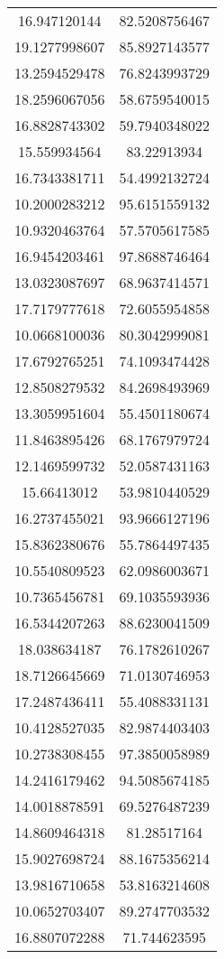 \begin{table}
\begin{tabular}{cc}
16.947120144 & 82.5208756467 \\
19.1277998607 & 85.8927143577 \\
13.2594529478 & 76.8243993729 \\
18.2596067056 & 58.6759540015 \\
16.8828743302 & 59.7940348022 \\
15.559934564 & 83.22913934 \\
16.7343381711 & 54.4992132724 \\
10.2000283212 & 95.6151559132 \\
10.9320463764 & 57.5705617585 \\
16.9454203461 & 97.8688746464 \\
13.0323087697 & 68.9637414571 \\
17.7179777618 & 72.6055954858 \\
10.0668100036 & 80.3042999081 \\
17.6792765251 & 74.1093474428 \\
12.8508279532 & 84.2698493969 \\
13.3059951604 & 55.4501180674 \\
11.8463895426 & 68.1767979724 \\
12.1469599732 & 52.0587431163 \\
15.66413012 & 53.9810440529 \\
16.2737455021 & 93.9666127196 \\
15.8362380676 & 55.7864497435 \\
10.5540809523 & 62.0986003671 \\
10.7365456781 & 69.1035593936 \\
16.5344207263 & 88.6230041509 \\
18.038634187 & 76.1782610267 \\
18.7126645669 & 71.0130746953 \\
17.2487436411 & 55.4088331131 \\
10.4128527035 & 82.9874403403 \\
10.2738308455 & 97.3850058989 \\
14.2416179462 & 94.5085674185 \\
14.0018878591 & 69.5276487239 \\
14.8609464318 & 81.28517164 \\
15.9027698724 & 88.1675356214 \\
13.9816710658 & 53.8163214608 \\
10.0652703407 & 89.2747703532 \\
16.8807072288 & 71.744623595 \\

\end{tabular}
\end{table}
